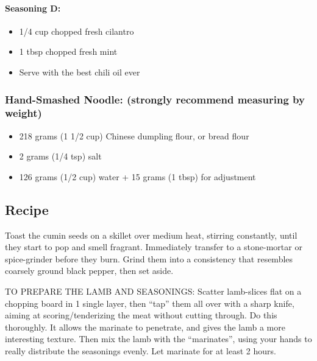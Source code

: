 \documentclass[]{article}
\providecommand{\tightlist}{%
  \setlength{\itemsep}{0pt}\setlength{\parskip}{0pt}}
\let\oldparagraph\paragraph
\renewcommand{\paragraph}[1]{\oldparagraph{#1}\mbox{}}
\begin{document}
\hypertarget{seasoning-d}{%
\paragraph{Seasoning D:}\label{seasoning-d}}

\begin{itemize}
\tightlist
\item
  1/4 cup chopped fresh cilantro
\item
  1 tbsp chopped fresh mint
\item
  Serve with the best chili oil ever
\end{itemize}

\hypertarget{hand-smashed-noodle-strongly-recommend-measuring-by-weight}{%
\subsubsection{Hand-Smashed Noodle: (strongly recommend measuring by weight)}\label{hand-smashed-noodle-strongly-recommend-measuring-by-weight}}

\begin{itemize}
\tightlist
\item
  218 grams (1 1/2 cup) Chinese dumpling flour, or bread flour
\item
  2 grams (1/4 tsp) salt
\item
  126 grams (1/2 cup) water + 15 grams (1 tbsp) for adjustment
\end{itemize}

\hypertarget{recipe}{%
\subsection{Recipe}\label{recipe}}

Toast the cumin seeds on a skillet over medium heat, stirring constantly, until they start to pop and smell fragrant. Immediately transfer to a stone-mortar or spice-grinder before they burn. Grind them into a consistency that resembles coarsely ground black pepper, then set aside.

TO PREPARE THE LAMB AND SEASONINGS: Scatter lamb-slices flat on a chopping board in 1 single layer, then ``tap'' them all over with a sharp knife, aiming at scoring/tenderizing the meat without cutting through. Do this thoroughly. It allows the marinate to penetrate, and gives the lamb a more interesting texture. Then mix the lamb with the ``marinates'', using your hands to really distribute the seasonings evenly. Let marinate for at least 2 hours.
\end{document}
